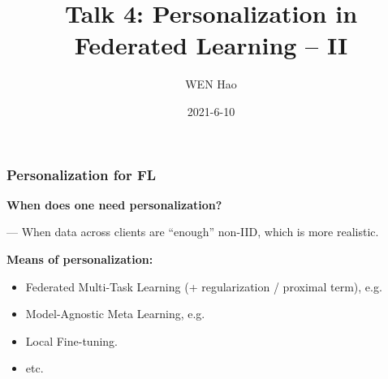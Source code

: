 


\title[Personalization]{Talk 4: Personalization in Federated Learning -- II}
\date{2021-6-10}
\author[]{WEN Hao}




\setlength{\belowdisplayskip}{5pt} \setlength{\belowdisplayshortskip}{5pt}
\setlength{\abovedisplayskip}{5pt} \setlength{\abovedisplayshortskip}{5pt}


\begin{frame}
\titlepage %
\end{frame}

\begin{frame}
\frametitle{Personalization for FL}

{\bfseries When does one need personalization?}

\vspace{0.2em}
\noindent --- When data across clients are ``enough'' non-IID, which is more realistic.

\pause
\vspace{0.8em}

{\bfseries Means of personalization:}
\begin{itemize}
    \item Federated Multi-Task Learning (+ regularization / proximal term), e.g. \cite{smith2017mocha}
    \item Model-Agnostic Meta Learning, e.g. \cite{finn2017maml}
    \item Local Fine-tuning.
    \item etc.
\end{itemize}

\end{frame}

